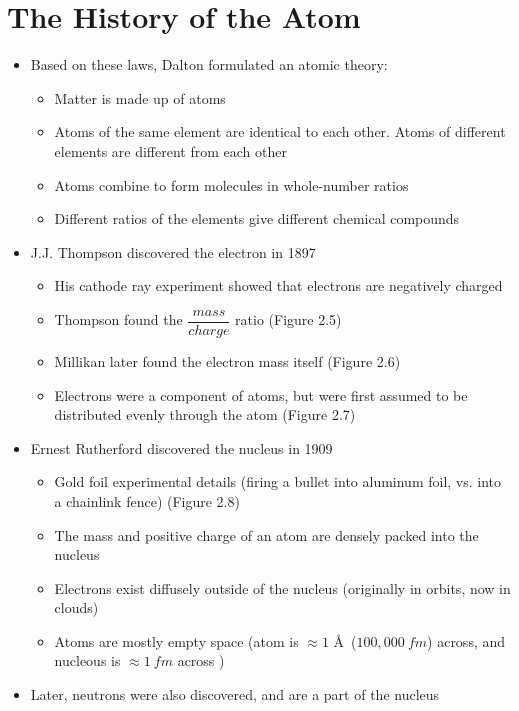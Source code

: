 \documentclass[12pt, openany, letterpaper]{memoir}
\begin{document}
\section{The History of the Atom}
\begin{itemize}
	\item Based on these laws, Dalton formulated an atomic theory:
	      \begin{itemize}
		      \item Matter is made up of atoms
		      \item Atoms of the same element are identical to each other. Atoms of different elements are different from each other
		      \item Atoms combine to form molecules in whole-number ratios
		      \item Different ratios of the elements give different chemical compounds
	      \end{itemize}
	\item J.J. Thompson discovered the electron in 1897
	      \begin{itemize}
		      \item His cathode ray experiment showed that electrons are negatively charged
		      \item Thompson found the $\dfrac{mass}{charge}$ ratio (Figure 2.5)
          \item Millikan later found the electron mass itself (Figure 2.6)
		      \item Electrons were a component of atoms, but were first assumed to be distributed evenly through the atom (Figure 2.7)
	      \end{itemize}
	\item Ernest Rutherford discovered the nucleus in 1909
	      \begin{itemize}
		      \item Gold foil experimental details (firing a bullet into aluminum foil, vs. into a chainlink fence) (Figure 2.8)
		      \item The mass and positive charge of an atom are densely packed into the nucleus
		      \item Electrons exist diffusely outside of the nucleus (originally in orbits, now in clouds)
		      \item Atoms are mostly empty space (atom is $\approx 1$ \AA ~($100,000~fm$) across, and nucleous is $\approx 1~fm$ across )
	      \end{itemize}
	\item Later, neutrons were also discovered, and are a part of the nucleus
\end{itemize}
\end{document}
